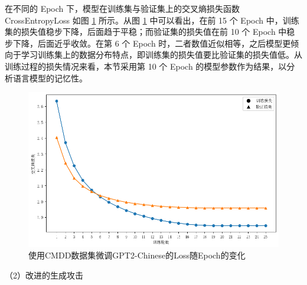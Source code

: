 
在不同的 Epoch 下，模型在训练集与验证集上的交叉熵损失函数 CrossEntropyLoss 如图 \ref{CMDD_Train_Valid_Result_Chap3} 所示。从图 \ref{CMDD_Train_Valid_Result_Chap3} 中可以看出，在前 15 个 Epoch 中，训练集的损失值稳步下降，后面趋于平稳；而验证集的损失值在前 10 个 Epoch 中稳步下降，后面近乎收敛。在第 6 个 Epoch 时，二者数值近似相等，之后模型更倾向于学习训练集上的数据分布特点，即训练集的损失值要比验证集的损失值低。从训练过程的损失情况来看，本节采用第 10 个 Epoch 的模型参数作为结果，以分析语言模型的记忆性。

\begin{figure}[h]
	\centering
	\includegraphics[width=\linewidth]{figures/CMDD_Train_Valid_Result_Chap3.png}
	\caption{使用CMDD数据集微调GPT2-Chinese的Loss随Epoch的变化}
	\label{CMDD_Train_Valid_Result_Chap3}
\end{figure}

（2）改进的生成攻击


